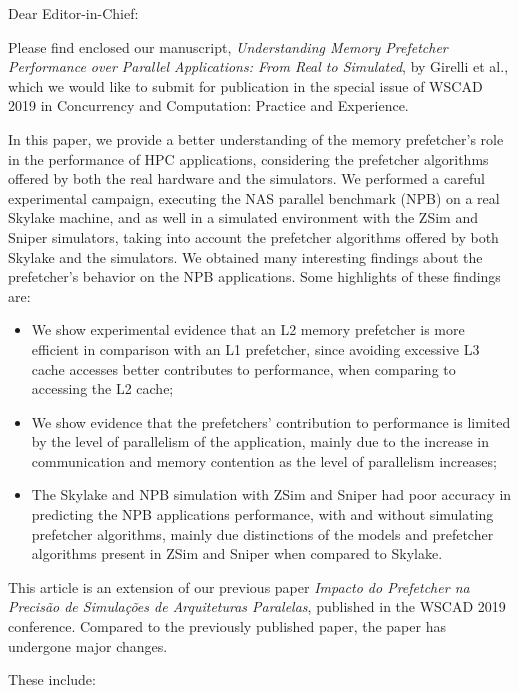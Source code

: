 \documentclass{letter}
\begin{document}
\begin{letter}{}

\opening{Dear Editor-in-Chief:}

Please find enclosed our manuscript, \emph{Understanding Memory Prefetcher Performance over Parallel Applications: From Real to Simulated}, by Girelli et al., which we would like to submit for publication in the special issue of WSCAD 2019 in Concurrency and Computation: Practice and Experience.

In this paper, we provide a better understanding of the memory prefetcher's role in the performance of HPC applications, considering the prefetcher algorithms offered by both the real hardware and the simulators. We performed a careful experimental campaign, executing the NAS parallel benchmark (NPB) on a real Skylake machine, and as well in a simulated environment with the ZSim and Sniper simulators, taking into account the prefetcher algorithms offered by both Skylake and the simulators. 
We obtained many interesting findings about the prefetcher's behavior on the NPB applications. Some highlights of these findings are: 

\begin{itemize}
    \item We show experimental evidence that an L2 memory prefetcher is more efficient in comparison with an L1 prefetcher, since avoiding excessive L3 cache accesses better contributes to performance, when comparing to accessing the L2 cache;
    \item We show evidence that the prefetchers' contribution to performance is limited by the level of parallelism of the application, mainly due to the increase in communication and memory contention as the level of parallelism increases;
    \item The Skylake and NPB simulation with ZSim and Sniper had poor accuracy in predicting the NPB applications performance, with and without simulating prefetcher algorithms, mainly due distinctions of the models and prefetcher algorithms present in ZSim and Sniper when compared to Skylake.
\end{itemize}

This article is an extension of our previous paper \emph{Impacto do Prefetcher na Precisão de Simulações de Arquiteturas Paralelas}, published in the WSCAD 2019 conference. Compared to the previously published paper, the paper has undergone major changes. 

These include:

\begin{itemize}


\end{itemize}
\end{letter}
\end{document}
